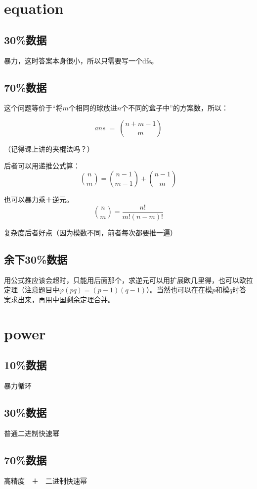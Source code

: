 \documentclass{article}
\begin{document}
	\section{equation}
		\subsection{30\%数据}
			暴力，这时答案本身很小，所以只需要写一个dfs。
		\subsection{70\%数据}
			这个问题等价于“将$m$个相同的球放进$n$个不同的盒子中”的方案数，所以：
			
			$$
				ans \; = \; \binom{n+m-1}{m}
			$$
			
			（记得课上讲的夹棍法吗？）
			
			后者可以用递推公式算：
			$$
				\binom{n}{m} = \binom{n-1}{m-1} + \binom{n-1}{m}
			$$
			
			也可以暴力乘＋逆元。
			$$
				\binom{n}{m} = \frac{n!}{m!(n-m)!}
			$$
			
			复杂度后者好点（因为模数不同，前者每次都要推一遍）
		\subsection{余下30\%数据}
			
			用公式推应该会超时，只能用后面那个，求逆元可以用扩展欧几里得，也可以欧拉定理（注意题目中$\varphi(pq) = (p-1)(q-1)$）。当然也可以在在模$p$和模$q$时答案求出来，再用中国剩余定理合并。
			
		\newpage
		
	\section{power}
		
		\subsection{10\%数据}
			暴力循环
			
		\subsection{30\%数据}
			普通二进制快速幂
			
		\subsection{70\%数据}
			高精度　＋　二进制快速幂
			
\end{document}
